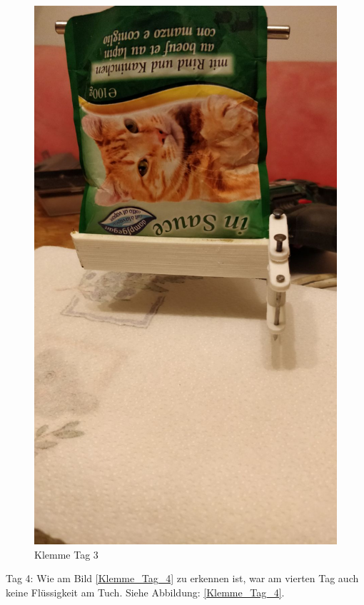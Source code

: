 \begin{figure}[H]
   \begin{minipage}[hbt]{.3\linewidth} %
      \includegraphics[width=\linewidth]{Bilder/Dichtheitsexperiment/Tag_3}
      \caption{Klemme Tag 3}
      \label{Klemme_Tag_3}
   \end{minipage}
\end{figure}

Tag 4: Wie am Bild \ref{Klemme_Tag_4} zu erkennen ist, war am vierten Tag auch keine Flüssigkeit am Tuch. Siehe Abbildung: \ref{Klemme_Tag_4}.\\ 

